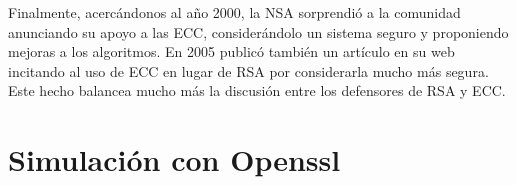 \documentclass{article}
\begin{document}
Finalmente, acercándonos al año 2000, la NSA sorprendió a la comunidad
anunciando su apoyo a las ECC, considerándolo un sistema seguro y
proponiendo mejoras a los algoritmos. En 2005 publicó también un
artículo en su web incitando al uso de ECC en lugar de RSA por
considerarla mucho más segura. Este hecho balancea mucho más la
discusión entre los defensores de RSA y ECC.

\section{Simulación con Openssl}
\end{document}

